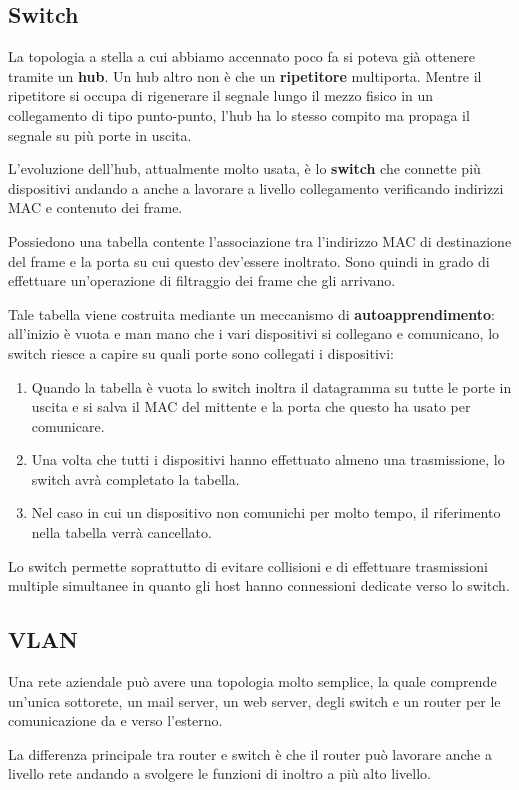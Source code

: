 \subsection{Switch}
La topologia a stella a cui abbiamo accennato poco fa si poteva
già ottenere tramite un \textbf{hub}. Un hub altro non è che un 
\textbf{ripetitore} multiporta. Mentre il ripetitore si occupa di 
rigenerare il segnale lungo il mezzo fisico in un collegamento di tipo
punto-punto, l'hub ha lo stesso compito ma propaga il segnale su più
porte in uscita.

L'evoluzione dell'hub, attualmente molto usata, è lo \textbf{switch}
che connette più dispositivi andando a anche a lavorare a livello 
collegamento verificando indirizzi MAC e contenuto dei frame.

Possiedono una tabella contente l'associazione tra l'indirizzo MAC di
destinazione del frame e la porta su cui questo dev'essere inoltrato.
Sono quindi in grado di effettuare un'operazione di filtraggio dei 
frame che gli arrivano.

Tale tabella viene costruita mediante un meccanismo di 
\textbf{autoapprendimento}: all'inizio è vuota e man mano che i vari
dispositivi si collegano e comunicano, lo switch riesce a capire su
quali porte sono collegati i dispositivi:
\begin{enumerate}
	\item Quando la tabella è vuota lo switch inoltra il datagramma su
		tutte le porte in uscita e si salva il MAC del mittente e la
		porta che questo ha usato per comunicare.
	\item Una volta che tutti i dispositivi hanno effettuato almeno
		una trasmissione, lo switch avrà completato la tabella.
	\item Nel caso in cui un dispositivo non comunichi per molto 
		tempo, il riferimento nella tabella verrà cancellato.
\end{enumerate}
Lo switch permette soprattutto di evitare collisioni e di effettuare
trasmissioni multiple simultanee in quanto gli host hanno connessioni
dedicate verso lo switch.

\subsection{VLAN}
Una rete aziendale può avere una topologia molto semplice, la quale 
comprende un'unica sottorete, un mail server, un web server, degli 
switch e un router per le comunicazione da e verso l'esterno.

La differenza principale tra router e switch è che il router può 
lavorare anche a livello rete andando a svolgere le funzioni di inoltro
a più alto livello.


